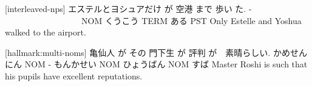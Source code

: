 [interleaved-nps]
エステルとヨシュアだけ が  空港    まで 歩い  た.
-  　　　　　　　　　NOM くうこう TERM ある  PST
Only Estelle and Yoshua walked to the airport.

[hallmark:multi-noms]
亀仙人      が  その  門下生    が   評判    が　素晴らしい.
かめせんにん NOM -   もんかせい NOM ひょうばん NOM すば
Master Roshi is such that his pupils have excellent reputations.